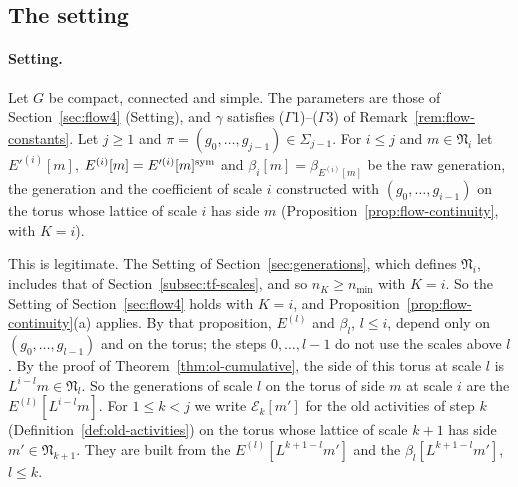 \subsection{The setting}\label{subsec:gl-setting}

\paragraph{Setting.} Let $G$ be compact, connected and simple. The parameters are those of Section~\ref{sec:flow4} (Setting), and $\gamma$ satisfies ($\Gamma$1)--($\Gamma$3) of Remark~\ref{rem:flow-constants}. Let $j\ge1$ and $\pi=(g_0,\dots,g_{j-1})\in\Sigma_{j-1}$. For $i\le j$ and $m\in\mathfrak N_i$ let $E'^{(i)}[m]$, $E^{(i)}[m]=E'^{(i)}[m]^{\rm sym}$ and $\beta_i[m]=\beta_{E^{(i)}[m]}$ be the raw generation, the generation and the coefficient of scale $i$ constructed with $(g_0,\dots,g_{i-1})$ on the torus whose lattice of scale $i$ has side $m$ (Proposition~\ref{prop:flow-continuity}, with $K=i$).

This is legitimate. The Setting of Section~\ref{sec:generations}, which defines $\mathfrak N_i$, includes that of Section~\ref{subsec:tf-scales}, and so $n_K\ge n_{\min}$ with $K=i$. So the Setting of Section~\ref{sec:flow4} holds with $K=i$, and Proposition~\ref{prop:flow-continuity}(a) applies. By that proposition, $E^{(l)}$ and $\beta_l$, $l\le i$, depend only on $(g_0,\dots,g_{l-1})$ and on the torus; the steps $0,\dots,l-1$ do not use the scales above $l$. By the proof of Theorem~\ref{thm:ol-cumulative}, the side of this torus at scale $l$ is $L^{i-l}m\in\mathfrak N_l$. So the generations of scale $l$ on the torus of side $m$ at scale $i$ are the $E^{(l)}[L^{i-l}m]$. For $1\le k<j$ we write $\mathcal E_k[m']$ for the old activities of step $k$ (Definition~\ref{def:old-activities}) on the torus whose lattice of scale $k+1$ has side $m'\in\mathfrak N_{k+1}$. They are built from the $E^{(l)}[L^{k+1-l}m']$ and the $\beta_l[L^{k+1-l}m']$, $l\le k$.

